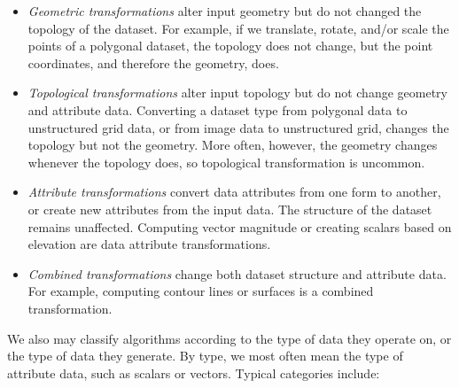 \begin{itemize}

\item \emph{Geometric transformations} alter input geometry but do not changed the topology of the dataset. For example, if we translate, rotate, and/or scale the points of a polygonal dataset, the topology does not change, but the point coordinates, and therefore the geometry, does.

\item \emph{Topological transformations} alter input topology but do not change geometry and attribute data. Converting a dataset type from polygonal data to unstructured grid data, or from image data to unstructured grid, changes the topology but not the geometry. More often, however, the geometry changes whenever the topology does, so topological transformation is uncommon.

\item \emph{Attribute transformations} convert data attributes from one form to another, or create new attributes from the input data. The structure of the dataset remains unaffected. Computing vector magnitude or creating scalars based on elevation are data attribute transformations.

\item \emph{Combined transformations} change both dataset structure and attribute data. For example, computing contour lines or surfaces is a combined transformation.

\end{itemize}

We also may classify algorithms according to the type of data they operate on, or the type of data they generate. By type, we most often mean the type of attribute data, such as scalars or vectors. Typical categories include:

